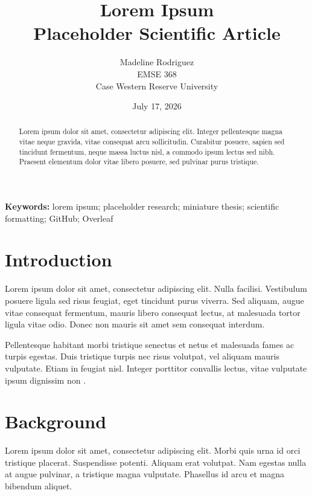 \documentclass[11pt]{article}
\title{
    \textbf{Lorem Ipsum }\\
    \large Placeholder Scientific Article
}
\author{
    Madeline Rodriguez\\ 
    EMSE 368\\
    Case Western Reserve University
}
\date{July 17, 2026\\}
\begin{document}
\maketitle

\begin{abstract}
Lorem ipsum dolor sit amet, consectetur adipiscing elit. Integer
pellentesque magna vitae neque gravida, vitae consequat arcu
sollicitudin. Curabitur posuere, sapien sed tincidunt fermentum, neque
massa luctus nisl, a commodo ipsum lectus sed nibh. Praesent elementum
dolor vitae libero posuere, sed pulvinar purus tristique. 
\end{abstract}

\noindent
\textbf{Keywords:}
lorem ipsum; placeholder research; miniature thesis; scientific
formatting; GitHub; Overleaf

\section{Introduction}

Lorem ipsum dolor sit amet, consectetur adipiscing elit. Nulla facilisi.
Vestibulum posuere ligula sed risus feugiat, eget tincidunt purus
viverra. Sed aliquam, augue vitae consequat fermentum, mauris libero
consequat lectus, at malesuada tortor ligula vitae odio. Donec non
mauris sit amet sem consequat interdum.

Pellentesque habitant morbi tristique senectus et netus et malesuada
fames ac turpis egestas. Duis tristique turpis nec risus volutpat, vel
aliquam mauris vulputate. Etiam in feugiat nisl. Integer porttitor
convallis lectus, vitae vulputate ipsum dignissim non
\cite{placeholder2024}.

\section{Background}

Lorem ipsum dolor sit amet, consectetur adipiscing elit. Morbi quis
urna id orci tristique placerat. Suspendisse potenti. Aliquam erat
volutpat. Nam egestas nulla at augue pulvinar, a tristique magna
vulputate. Phasellus id arcu et magna bibendum aliquet.
\end{document}
